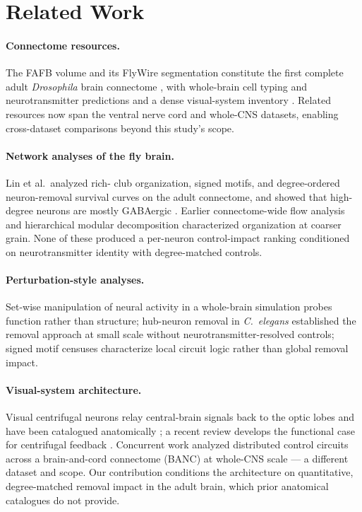 \section{Related Work}

\paragraph{Connectome resources.} The FAFB volume and its FlyWire
segmentation constitute the first complete adult \emph{Drosophila} brain
connectome \cite{dorkenwald2024}, with whole-brain cell typing and
neurotransmitter predictions \cite{schlegel2024} and a dense visual-system
inventory \cite{matsliah2024}. Related resources now span the ventral
nerve cord and whole-CNS datasets, enabling cross-dataset comparisons
beyond this study's scope.

\paragraph{Network analyses of the fly brain.} Lin et al.\ analyzed rich-
club organization, signed motifs, and degree-ordered neuron-removal
survival curves on the adult connectome, and showed that high-degree
neurons are mostly GABAergic \cite{lin2024}. Earlier connectome-wide flow
analysis \cite{shih2015} and hierarchical modular decomposition
\cite{kunin2023} characterized organization at coarser grain. None of
these produced a per-neuron control-impact ranking conditioned on
neurotransmitter identity with degree-matched controls.

\paragraph{Perturbation-style analyses.} Set-wise manipulation of neural
activity in a whole-brain simulation \cite{shiu2024} probes function
rather than structure; hub-neuron removal in \emph{C.\ elegans}
\cite{uzel2022} established the removal approach at small scale without
neurotransmitter-resolved controls; signed motif censuses
\cite{szilagyi2026} characterize local circuit logic rather than global
removal impact.

\paragraph{Visual-system architecture.} Visual centrifugal neurons relay
central-brain signals back to the optic lobes and have been catalogued
anatomically \cite{matsliah2024,hoeller2026}; a recent review develops the
functional case for centrifugal feedback \cite{mickels2026}. Concurrent
work analyzed distributed control circuits across a brain-and-cord
connectome (BANC) at whole-CNS scale \cite{bates2026} --- a different
dataset and scope. Our contribution conditions the architecture on
quantitative, degree-matched removal impact in the adult brain, which
prior anatomical catalogues do not provide.

